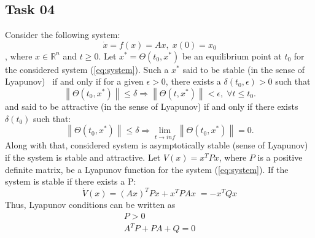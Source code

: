 \documentclass[12pt]{article}%
\begin{document}
\subsection{Task 04}
Consider the following system:
\begin{equation}\label{eq:system}
    \dot{x} = f(x) = Ax, \; x(0) = x_0
\end{equation}, where $x\in \mathbb{R}^n$ and $t \geq 0$. Let $x^* = \Theta(t_0,x^*)$ be an equilibrium point at $t_0$ for the considered system (\ref{eq:system}). Such a $x^*$ said to be stable (in the sense of Lyapunov)~\cite{ronbun} if and only if for a given $\epsilon > 0$, there exists a $\delta(t_0, \epsilon) >0$ such that 
\begin{equation}
    \left \|  \Theta(t_0,x^*) \right \| \leq \delta \Rightarrow \left \| \Theta(t,x^*) \right \| < \epsilon, \; \forall t \leq t_0.
\end{equation} and said to be attractive (in the sense of Lyapunov) if and only if there exists $\delta (t_0)$ such  that:
\begin{equation}
    \left \| \Theta(t_0,x^*)\right \| \leq \delta \Rightarrow \lim_{t\rightarrow inf} \left \| \Theta(t_0,x^*) \right \| = 0.
\end{equation}Along with that, considered system is asymptotically stable (sense of Lyapunov) if the system is stable and attractive. Let $V(x) = x^TPx$, where $P$ is a positive definite matrix, be a Lyapunov function for the system (\ref{eq:system}). If the system is stable if there exists a P:
\begin{equation}
    \dot{V}(x) = (Ax)^TPx + x^TPAx \; = -x^TQx
\end{equation}Thus, Lyapunov conditions can be written as 
\begin{equation}
    \begin{aligned}
      P >0 \\
      A^TP + PA + Q = 0
    \end{aligned}
\end{equation}
\end{document}
